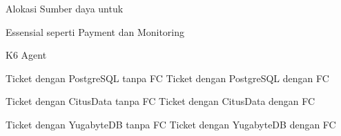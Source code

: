 Alokasi Sumber daya untuk

Essensial seperti Payment dan Monitoring

K6 Agent

Ticket dengan PostgreSQL tanpa FC
Ticket dengan PostgreSQL dengan FC

Ticket dengan CitusData tanpa FC
Ticket dengan CitusData dengan FC

Ticket dengan YugabyteDB tanpa FC
Ticket dengan YugabyteDB dengan FC

